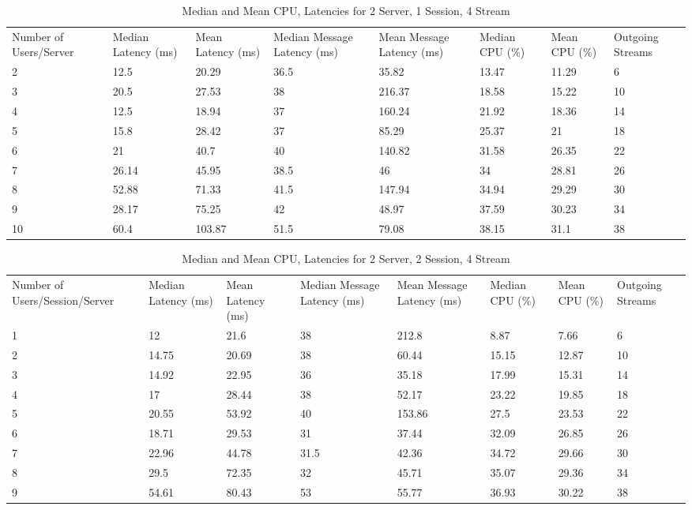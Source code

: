 \begin{table}
\caption{Median and Mean CPU, Latencies for 2 Server, 1 Session, 4 Stream}
\label{table:2serv_1sess_4str}
\begin{tabu} to\linewidth{|X[c]|X[c]|X[c]|X[c]|X[c]|X[c]|X[c]|X[c]|}
\everyrow{\hline}
\hline
Number of Users/Server & Median Latency (ms) & Mean Latency (ms) & Median Message Latency (ms) & Mean Message Latency (ms) & Median CPU (\%) & Mean CPU (\%) & Outgoing Streams\\
2 & 12.5 & 20.29 & 36.5 & 35.82 & 13.47 & 11.29 & 6 \\
3 & 20.5 & 27.53 & 38 & 216.37 & 18.58 & 15.22 & 10 \\
4 & 12.5 & 18.94 & 37 & 160.24 & 21.92 & 18.36 & 14 \\
5 & 15.8 & 28.42 & 37 & 85.29 & 25.37 & 21 & 18 \\
6 & 21 & 40.7 & 40 & 140.82 & 31.58 & 26.35 & 22 \\
7 & 26.14 & 45.95 & 38.5 & 46 & 34 & 28.81 & 26 \\
8 & 52.88 & 71.33 & 41.5 & 147.94 & 34.94 & 29.29 & 30 \\
9 & 28.17 & 75.25 & 42 & 48.97 & 37.59 & 30.23 & 34 \\
10 & 60.4 & 103.87 & 51.5 & 79.08 & 38.15 & 31.1 & 38 \\
\end{tabu}
\end{table}

\begin{table}
\caption{Median and Mean CPU, Latencies for 2 Server, 2 Session, 4 Stream}
\label{table:2serv_2sess_4str}
\begin{tabu} to\linewidth{|X[c]|X[c]|X[c]|X[c]|X[c]|X[c]|X[c]|X[c]|}
\everyrow{\hline}
\hline
Number of Users/Session/Server & Median Latency (ms) & Mean Latency (ms) & Median Message Latency (ms) & Mean Message Latency (ms) & Median CPU (\%) & Mean CPU (\%) & Outgoing Streams\\
1 & 12 & 21.6 & 38 & 212.8 & 8.87 & 7.66 & 6 \\
2 & 14.75 & 20.69 & 38 & 60.44 & 15.15 & 12.87 & 10 \\
3 & 14.92 & 22.95 & 36 & 35.18 & 17.99 & 15.31 & 14 \\
4 & 17 & 28.44 & 38 & 52.17 & 23.22 & 19.85 & 18 \\
5 & 20.55 & 53.92 & 40 & 153.86 & 27.5 & 23.53 & 22 \\
6 & 18.71 & 29.53 & 31 & 37.44 & 32.09 & 26.85 & 26 \\
7 & 22.96 & 44.78 & 31.5 & 42.36 & 34.72 & 29.66 & 30 \\
8 & 29.5 & 72.35 & 32 & 45.71 & 35.07 & 29.36 & 34 \\
9 & 54.61 & 80.43 & 53 & 55.77 & 36.93 & 30.22 & 38 \\
\end{tabu}
\end{table}

